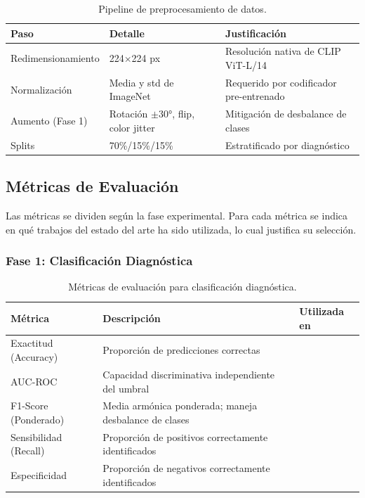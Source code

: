 \documentclass[11pt, a4paper]{article}
\begin{document}
\begin{table}[H]
\centering
\caption{Pipeline de preprocesamiento de datos.}
\label{tab:preproc}
\begin{tabular}{@{}llp{7cm}@{}}
\toprule
\textbf{Paso} & \textbf{Detalle} & \textbf{Justificación} \\
\midrule
Redimensionamiento & 224$\times$224 px & Resolución nativa de CLIP ViT-L/14 \\
Normalización & Media y std de ImageNet & Requerido por codificador pre-entrenado \\
Aumento (Fase 1) & Rotación $\pm$30°, flip, color jitter & Mitigación de desbalance de clases \cite{daneshjou_disparities_2022, aboulmira_skinhealthmate_2024} \\
Splits & 70\%/15\%/15\% & Estratificado por diagnóstico \\
\bottomrule
\end{tabular}
\end{table}

\subsection{Métricas de Evaluación}

Las métricas se dividen según la fase experimental. Para cada métrica se indica en qué trabajos del estado del arte ha sido utilizada, lo cual justifica su selección.

\subsubsection{Fase 1: Clasificación Diagnóstica}

\begin{table}[H]
\centering
\caption{Métricas de evaluación para clasificación diagnóstica.}
\label{tab:metricas_clas}
\begin{tabular}{@{}lp{5.5cm}p{5.5cm}@{}}
\toprule
\textbf{Métrica} & \textbf{Descripción} & \textbf{Utilizada en} \\
\midrule
Exactitud (Accuracy) & Proporción de predicciones correctas & \cite{yan_panderm_2024, yilmaz_dermatollama_2025, xu_mpoxvlm_2024, groh_fitzpatrick17k_2021} \\
AUC-ROC & Capacidad discriminativa independiente del umbral & \cite{yan_panderm_2024, yan_derm1m_2025, kim_monet_2024, daneshjou_disparities_2022} \\
F1-Score (Ponderado) & Media armónica ponderada; maneja desbalance de clases & \cite{yan_panderm_2024, xu_mpoxvlm_2024, khan_ensemble_2025} \\
Sensibilidad (Recall) & Proporción de positivos correctamente identificados & \cite{khan_ensemble_2025, daneshjou_disparities_2022} \\
Especificidad & Proporción de negativos correctamente identificados & \cite{kim_monet_2024, daneshjou_disparities_2022} \\
\bottomrule
\end{tabular}
\end{table}
\end{document}
